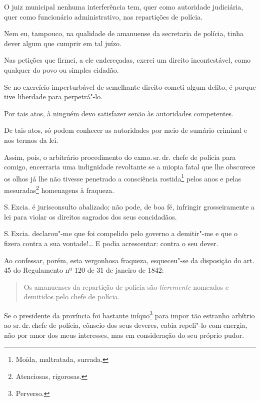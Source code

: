 
O juiz municipal nenhuma interferência tem, quer como autoridade
judiciária, quer como funcionário administrativo, nas repartições de
polícia.

Nem eu, tampouco, na qualidade de amanuense da secretaria de polícia,
tinha dever algum que cumprir em tal juízo.

Nas petições que firmei, a ele endereçadas, exerci um direito
incontestável, como qualquer do povo ou simples cidadão.

Se no exercício imperturbável de semelhante direito cometi algum delito,
é porque tive liberdade para perpetrá"-lo.

Por tais atos, à ninguém devo satisfazer senão às autoridades
competentes.

De tais atos, só podem conhecer as autoridades por meio de sumário
criminal e nos termos da lei.

Assim, pois, o arbitrário procedimento do exmo.\,sr.\,dr. chefe de polícia
para comigo, encerraria uma indignidade revoltante se a miopia fatal que
lhe obscurece os olhos já lhe não tivesse penetrado a consciência
rostida\footnote{Moída, maltratada, surrada.} pelos anos e pelas
mesuradas\footnote{Atenciosas, rigorosas.} homenagens à fraqueza.

S.\,Excia. é jurisconsulto abalizado; não pode, de boa fé, infringir
grosseiramente a lei para violar os direitos sagrados dos seus
concidadãos.

S.\,Excia. declarou"-me que foi compelido pelo governo a demitir"-me e que
o fizera contra a sua vontade!\ldots{} E podia acrescentar: contra o seu
dever.

Ao confessar, porém, esta vergonhosa fraqueza, esqueceu"-se da disposição
do art. 45 do Regulamento nº 120 de 31 de janeiro de 1842:

\begin{quote}
Os amanuenses da repartição de polícia são \emph{livremente} nomeados e
demitidos pelo chefe de polícia.
\end{quote}

Se o presidente da província foi bastante iníquo\footnote{Perverso.}
para impor tão estranho arbítrio ao sr.\,dr.\,chefe de polícia, cônscio
dos seus deveres, cabia repeli"-lo com energia, não por amor dos meus
interesses, mas em consideração do seu próprio pudor.

